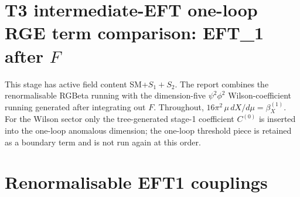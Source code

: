 \documentclass[8pt]{article}
\begin{document}
\begin{landscape}
\section*{T3 intermediate-EFT one-loop RGE term comparison: EFT\_1 after $F$}
This stage has active field content SM+$S_1+S_2$. The report combines the renormalisable RGBeta running with the dimension-five $\psi^2\phi^2$ Wilson-coefficient running generated after integrating out $F$.
\medskip
Throughout, $16\pi^2\,\mu\,dX/d\mu=\beta_X^{(1)}$. For the Wilson sector only the tree-generated stage-1 coefficient $C^{(0)}$ is inserted into the one-loop anomalous dimension; the one-loop threshold piece is retained as a boundary term and is not run again at this order.
\section*{Renormalisable EFT1 couplings}

\end{landscape}
\end{document}
